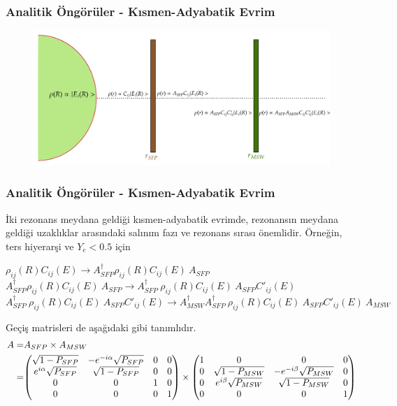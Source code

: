 \documentclass[10pt]{beamer}
\begin{document}
\begin{frame}
    \frametitle{Analitik Öngörüler - Kısmen-Adyabatik Evrim}
    \begin{figure}[hbt!]
        \centering
        \includegraphics[width=\textwidth]{fig/rhoSFPMSW.png}
    \end{figure}
\end{frame}

\begin{frame}
    \frametitle{Analitik Öngörüler - Kısmen-Adyabatik Evrim}
    İki rezonans meydana geldiği kısmen-adyabatik evrimde, rezonansın meydana geldiği uzaklıklar arasındaki salınım fazı ve rezonans sırası önemlidir. Örneğin, ters hiyerarşi ve $ Y_{e}<0.5 $ için
    \begin{outline}
        \1[\textbf{1)}] $\rho_{ij}(R)C_{ij}(E) \rightarrow A^{\dagger}_{SFP}\rho_{ij}(R)C_{ij}(E)~A_{SFP}$
        \color{lightgray}
        \1[\textbf{2)}] $A^{\dagger}_{SFP}\rho_{ij}(R)C_{ij}(E)~A_{SFP} \rightarrow A^{\dagger}_{SFP} ~ \rho_{ij}(R)C_{ij}(E)~A_{SFP} C'_{ij}(E)$
        \1[\textbf{3)}] $A^{\dagger}_{SFP} ~ \rho_{ij}(R)C_{ij}(E)~A_{SFP} C'_{ij}(E)\rightarrow A^{\dagger}_{MSW}A^{\dagger}_{SFP}~\rho_{ij}(R)C_{ij}(E)~A_{SFP} C'_{ij}(E)~A_{MSW}$
    \end{outline}
    \color{lightgray}
    Geçiş matrisleri de aşağıdaki gibi tanımlıdır.
    \tiny
    \begin{align*}
        A =& A_{SFP} \times A_{MSW}\\
          =& \mqty(\sqrt{1-P_{SFP}} & -e^{-i\alpha}\sqrt{P_{SFP}} & 0 & 0 \\
      e^{i\alpha}\sqrt{P_{SFP}} & \sqrt{1-P_{SFP}} & 0 & 0 \\ 0 & 0 & 1 & 0 \\ 0 & 0 & 0 & 1) \times
      \mqty(1 & 0 & 0 & 0 \\ 0 & \sqrt{1-P_{MSW}} & -e^{-i\beta}\sqrt{P_{MSW}} & 0 \\ 0 & e^{i\beta}\sqrt{P_{MSW}} & \sqrt{1-P_{MSW}} & 0 \\ 0 & 0 & 0 & 1)
    \end{align*}
    \normalsize
\end{frame}
\end{document}
